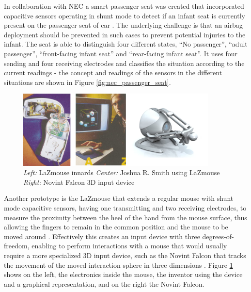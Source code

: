 In collaboration with NEC a smart passenger seat was created that incorporated capacitive sensors operating in shunt mode to detect if an infant seat is currently present on the passenger seat of car \cite{Smith1999a}. The underlying challenge is that an airbag deployment should be prevented in such cases to prevent potential injuries to the infant. The seat is able to distinguish four different states, “No passenger”, “adult passenger”, “front-facing infant seat” and “rear-facing infant seat”. It uses four sending and four receiving electrodes and classifies the situation according to the current readings - the concept and readings of the sensors in the different situations are shown in Figure \ref{fig:nec_passenger_seat}.
\begin{figure}[h]
\centering
\includegraphics[width=0.9\textwidth]{images/lazmouse}
\caption{\emph{Left:} LaZmouse innards \emph{Center:} Joshua R. Smith using LaZmouse \cite{Smith1999a} \emph{Right:} Novint Falcon 3D input device \cite{novint2014}}
\label{fig:lazmouse}
\end{figure}

Another prototype is the LaZmouse that extends a regular mouse with shunt mode capacitive sensors, having one transmitting and two receiving electrodes, to measure the proximity between the heel of the hand from the mouse surface, thus allowing the fingers to remain in the common position and the mouse to be moved around \cite{Smith1999a}. Effectively this creates an input device with three degrees-of-freedom, enabling to perform interactions with a mouse that would usually require a more specialized 3D input device, such as the Novint Falcon that tracks the movement of the moved interaction sphere in three dimensions \cite{novint2014}. Figure \ref{fig:lazmouse} shows on the left, the electronics inside the mouse, the inventor using the device and a graphical representation, and on the right the Novint Falcon.

